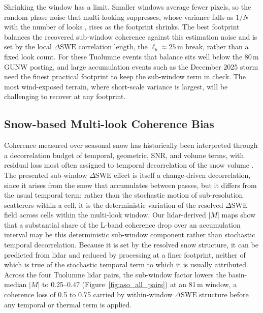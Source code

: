 \documentclass[tc, manuscript]{copernicus}
\begin{document}
Shrinking the window has a limit. Smaller windows average fewer pixels, so the random phase noise that multi-looking suppresses, whose variance falls as $1/N$ with the number of looks \citep{Bamler1998}, rises as the footprint shrinks. The best footprint balances the recovered sub-window coherence against this estimation noise and is set by the local $\Delta\mathrm{SWE}$ correlation length, the $\ell_b \approx 25$\,\unit{m} break, rather than a fixed look count. For these Tuolumne events that balance sits well below the 80\,\unit{m} GUNW posting, and large accumulation events such as the December 2025 storm need the finest practical footprint to keep the sub-window term in check. The most wind-exposed terrain, where short-scale variance is largest, will be challenging to recover at any footprint.

\subsection{Snow-based Multi-look Coherence Bias}\label{subsec:coherence-bias}

Coherence measured over seasonal snow has historically been interpreted through a decorrelation budget of temporal, geometric, SNR, and volume terms, with residual loss most often assigned to temporal decorrelation of the snow volume \citep{Ruiz2021, Oveisgharan2024}. The presented sub-window $\Delta\mathrm{SWE}$ effect is itself a change-driven decorrelation, since it arises from the snow that accumulates between passes, but it differs from the usual temporal term: rather than the stochastic motion of sub-resolution scatterers within a cell, it is the deterministic variation of the resolved $\Delta\mathrm{SWE}$ field across cells within the multi-look window. Our lidar-derived $|M|$ maps show that a substantial share of the L-band coherence drop over an accumulation interval may be this deterministic sub-window component rather than stochastic temporal decorrelation. Because it is set by the resolved snow structure, it can be predicted from lidar and reduced by processing at a finer footprint, neither of which is true of the stochastic temporal term to which it is usually attributed. Across the four Tuolumne lidar pairs, the sub-window factor lowers the basin-median $|M|$ to 0.25--0.47 (Figure~\ref{fig:aso_all_pairs}) at an 81\,\unit{m} window, a coherence loss of 0.5 to 0.75 carried by within-window $\Delta\mathrm{SWE}$ structure before any temporal or thermal term is applied.
\end{document}

